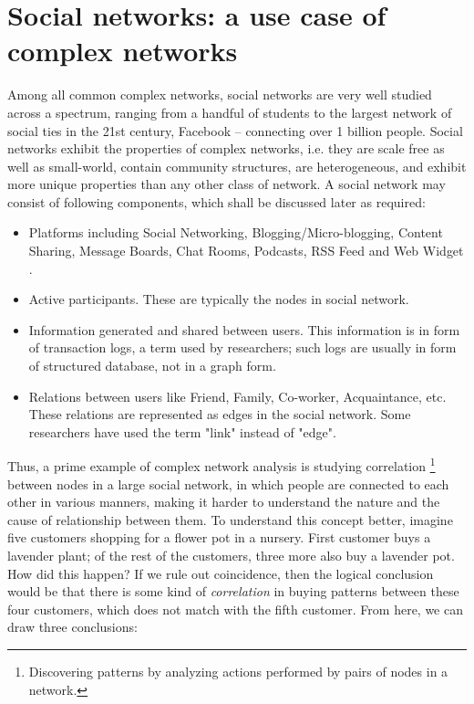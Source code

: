 	\section{Social networks: a use case of complex networks}
	\label{sec:intro-social-networks}
	Among all common complex networks, social networks are very well studied across a spectrum, ranging from a handful of students to the largest network of social ties in the 21st century, Facebook – connecting over 1 billion people. Social networks exhibit the properties of complex networks, i.e. they are scale free as well as small-world, contain community structures, are heterogeneous, and exhibit more unique properties than any other class of network. A social network may consist of following components, which shall be discussed later as required:
	
	\begin{itemize}
		\item Platforms including Social Networking, Blogging/Micro-blogging, Content Sharing, Message Boards, Chat Rooms, Podcasts, RSS Feed and Web Widget \cite{cui2011}.
		
		\item Active participants. These are typically the nodes in social network.
		
		\item Information generated and shared between users. This information is in form of transaction logs, a term used by researchers; such logs are usually in form of structured database, not in a graph form.
		
		\item Relations between users like Friend, Family, Co-worker, Acquaintance, etc. These relations are represented as edges in the social network. Some researchers have used the term "link" instead of "edge".
	\end{itemize}
	
	Thus, a prime example of complex network analysis is studying correlation \footnote{Discovering patterns by analyzing actions performed by pairs of nodes in a network.} between nodes in a large social network, in which people are connected to each other in various manners, making it harder to understand the nature and the cause of relationship between them. To understand this concept better, imagine five customers shopping for a flower pot in a nursery. First customer buys a lavender plant; of the rest of the customers, three more also buy a lavender pot. How did this happen? If we rule out coincidence, then the logical conclusion would be that there is some kind of \textit{correlation} in buying patterns between these four customers, which does not match with the fifth customer. From here, we can draw three conclusions:
	
